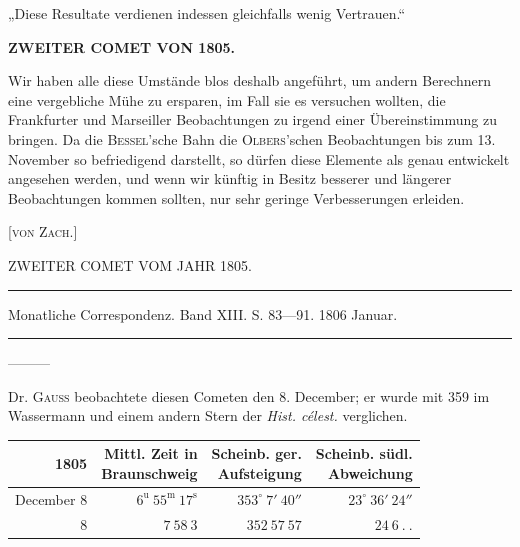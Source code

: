 „Diese Resultate verdienen indessen gleichfalls wenig Vertrauen.“
\par
{}
\clearpage
\thispagestyle{empty}
\noindent{}%
%
\parbox[t]{\dimexpr\linewidth-24mm\relax}{\centering\footnotesize\bfseries ZWEITER COMET VON 1805.\par}%
\makebox[12mm][r]{}\par\nobreak\medskip
\par\indent Wir haben alle diese Umstände blos deshalb angeführt, um andern Berechnern eine vergebliche Mühe zu ersparen, im Fall sie es versuchen wollten, die Frankfurter und Marseiller Beobachtungen zu irgend einer Übereinstimmung zu bringen. Da die \textsc{Bessel}'sche Bahn die \textsc{Olbers}'schen Beobachtungen bis zum 13. November so befriedigend darstellt, so dürfen diese Elemente als genau entwickelt angesehen werden, und wenn wir künftig in Besitz besserer und längerer Beobachtungen kommen sollten, nur sehr geringe Verbesserungen erleiden.

\hfill[\textsc{von Zach.}]

\par\medskip
{}
\begin{center}\large ZWEITER COMET VOM JAHR 1805.\end{center}
\begin{center}\parbox{.85\linewidth}{\centering\footnotesize\frenchspacing
\hrule height .3pt\relax\vspace{2.5pt}
Monatliche Correspondenz. Band XIII. S. 83—91. 1806 Januar.\par
\vspace{2.5pt}\hrule height .3pt\relax
}\end{center}
\par\indent ---\enspace---\enspace---\par\nobreak

Dr. \textsc{Gauss} beobachtete diesen Cometen den 8. December; er wurde mit 359 im Wassermann und einem andern Stern der \emph{Hist. célest.} verglichen.

\begin{center}
\begingroup\fontsize{9}{11}\selectfont\setlength{\tabcolsep}{3pt}\renewcommand{\arraystretch}{1.1}
\begin{tabular}{r|r|r|r}
1805 & \shortstack{Mittl. Zeit in\\Braunschweig} & \shortstack{Scheinb. ger.\\Aufsteigung} & \shortstack{Scheinb. südl.\\Abweichung}\\ \hline
December 8 & $6^{\mathrm u}\ 55^{\mathrm m}\ 17^{\mathrm s}$ & $353^\circ\ 7'\ 40''$ & $23^\circ\ 36'\ 24''$ \\
8 & $7\ 58\ 3$ & $352\ 57\ 57$ & $24\ 6\ .\ .$ \\
\end{tabular}\endgroup
\end{center}

